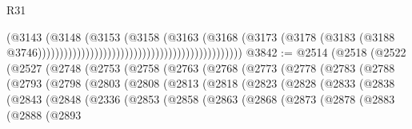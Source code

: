 \begin{lexlean}{R31}
\begin{coremodule}
                                                                              (@3143
                                                                                (@3148
                                                                                  (@3153
                                                                                    (@3158
                                                                                      (@3163
                                                                                        (@3168
                                                                                          (@3173
                                                                                            (@3178
                                                                                              (@3183
                                                                                                (@3188
                                                                                                  @3746)))))))))))))))))))))))))))))))))))))))))))))))
@3842 := @2514
    (@2518
      (@2522
        (@2527
          (@2748
            (@2753
              (@2758
                (@2763
                  (@2768
                    (@2773
                      (@2778
                        (@2783
                          (@2788
                            (@2793
                              (@2798
                                (@2803
                                  (@2808
                                    (@2813
                                      (@2818
                                        (@2823
                                          (@2828
                                            (@2833
                                              (@2838
                                                (@2843
                                                  (@2848
                                                    (@2336
                                                      (@2853
                                                        (@2858
                                                          (@2863
                                                            (@2868
                                                              (@2873
                                                                (@2878
                                                                  (@2883
                                                                    (@2888
                                                                      (@2893

\end{coremodule}
\end{lexlean}
